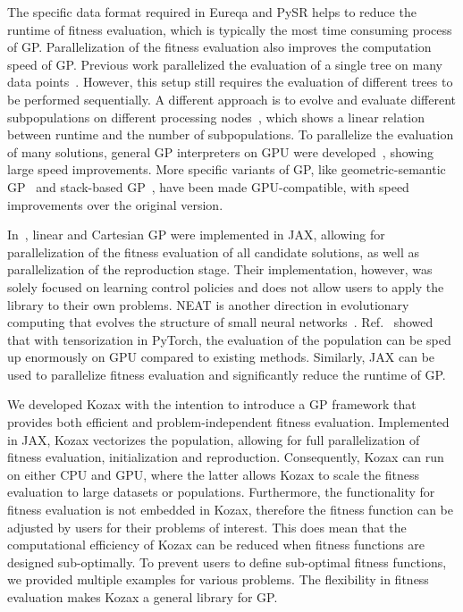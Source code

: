 \documentclass{article}
\begin{document}
The specific data format required in Eureqa and PySR helps to reduce the runtime of fitness evaluation, which is typically the most time consuming process of GP. Parallelization of the fitness evaluation also improves the computation speed of GP. Previous work parallelized the evaluation of a single tree on many data points~\cite{harding2007fast}. However, this setup still requires the evaluation of different trees to be performed sequentially. A different approach is to evolve and evaluate different subpopulations on different processing nodes~\cite{andre1998parallel, oussaidene1997parallel}, which shows a linear relation between runtime and the number of subpopulations. To parallelize the evaluation of many solutions, general GP interpreters on GPU were developed~\cite{langdon2008simd, robilliard2009genetic, cano2014gpu, langdon2010many}, showing large speed improvements. More specific variants of GP, like geometric-semantic GP~\cite{trujillo2022gsgp, castelli2019gsgp} and stack-based GP~\cite{sathia2021accelerating, chitty2017faster}, have been made GPU-compatible, with speed improvements over the original version. 

In~\cite{nadizar2024naturally}, linear and Cartesian GP were implemented in JAX, allowing for parallelization of the fitness evaluation of all candidate solutions, as well as parallelization of the reproduction stage. Their implementation, however, was solely focused on learning control policies and does not allow users to apply the library to their own problems. NEAT is another direction in evolutionary computing that evolves the structure of small neural networks~\cite{stanley2002evolving}. Ref.~\cite{wang2025evogp} showed that with tensorization in PyTorch, the evaluation of the population can be sped up enormously on GPU compared to existing methods. Similarly, JAX can be used to parallelize fitness evaluation and significantly reduce the runtime of GP.

We developed Kozax with the intention to introduce a GP framework that provides both efficient and problem-independent fitness evaluation. Implemented in JAX, Kozax vectorizes the population, allowing for full parallelization of fitness evaluation, initialization and reproduction. Consequently, Kozax can run on either CPU and GPU, where the latter allows Kozax to scale the fitness evaluation to large datasets or populations. Furthermore, the functionality for fitness evaluation is not embedded in Kozax, therefore the fitness function can be adjusted by users for their problems of interest. This does mean that the computational efficiency of Kozax can be reduced when fitness functions are designed sub-optimally. To prevent users to define sub-optimal fitness functions, we provided multiple examples for various problems. The flexibility in fitness evaluation makes Kozax a general library for GP.
\end{document}
